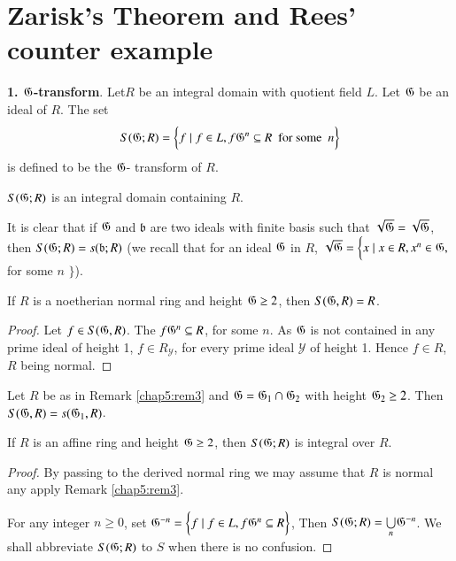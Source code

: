 \chapter{Zarisk's Theorem and Rees' counter example}%

{\bf 1. $\mathfrak{G}$-transform}. Let\pageoriginale $R$ be an integral domain with
 quotient field $L$. Let $\mathfrak{G}$ be an ideal of $R$. The set 
 $$
 S(\mathfrak{G} ;  R) = \bigg\{ f \mid f \in L , f \mathfrak{G}^n \subseteq R 
 ~\text{ for some }~ n   \bigg\} 
 $$
 is defined to be the $\mathfrak{G}$- transform of $R$. 

\setcounter{rem}{0}
 \begin{rem}%
   $S(\mathfrak{G} ; R)$ is an integral domain containing $R$.
 \end{rem}
 
\begin{rem}\label{chap5:rem2} %
  It is clear that if $\mathfrak{G}$ and $\mathfrak{b}$ are two ideals with finite
  basis such that $\sqrt{\mathfrak{G}}= \sqrt{\mathfrak{G}}$, then $
  S(\mathfrak{G} ; R) = s(\mathfrak{b} ; R) $ (we recall that for an ideal
  $\mathfrak{G}$ in $R$,    $\sqrt{\mathfrak{G}}= \bigg\{ x \mid x \in R, x^n
  \in \mathfrak{G},$ for some $n$ $\bigg\}$).  
\end{rem}

\begin{rem}\label{chap5:rem3}%
  If $R$ is a noetherian normal ring and height $\mathfrak{G} \ge 2$, then
  $S(\mathfrak{G}, R) = R $.
\end{rem}

\begin{proof}
  Let $f \in S(\mathfrak{G} , R)$. The $f \mathfrak{G}^n \subseteq R$, for
  some $n$. As $\mathfrak{G} $ is not contained in any prime ideal of height 1,
  $f \in R_{\mathscr{Y}}$, for every prime ideal $\mathscr{Y}$ of
  height 1. Hence $f \in R$, $R$ being normal. 
\end{proof}

\begin{coro*}
  Let $R$ be as in Remark \ref{chap5:rem3} and $\mathfrak{G} = \mathfrak{G}_1 \cap \mathfrak{G}_2$ with 
  height $\mathfrak{G}_2 \ge 2$. Then $S(\mathfrak{G} , R) = s(\mathfrak{G}_1 , R)$.
\end{coro*}

\begin{rem}%
  If $R$ is an affine ring and height $\mathfrak{G} \ge 2$, then $S(\mathfrak{G} ; R)$ 
 is integral over $R$.
\end{rem}

\begin{proof}
  By passing to the derived normal ring we may assume that $R$ is 
  normal any apply Remark \ref{chap5:rem3}. 

For any integer $ n \ge 0$, set $\mathfrak{G}^{-n}= \bigg\{ f \mid f \in
  L , f \mathfrak{G}^{n} \subseteq R\bigg\}$, Then $S(\mathfrak{G} ; R) =
  \underset{n}{\bigcup} \mathfrak{G}^{-n}$. We shall abbreviate
  $S(\mathfrak{G};  R)$ to $S$ when there is no confusion. 
\end{proof}

